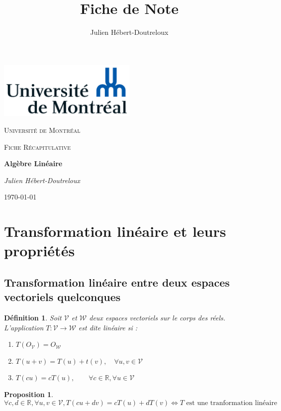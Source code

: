 \documentclass{article}[french, babel]
\author{Julien Hébert-Doutreloux}
\title{Fiche de Note}
\newtheorem{mydef}{Définition}
\newtheorem{myprop}{Proposition}
\let\stdsection\section
\renewcommand\section{\newpage\stdsection}
\begin{document}
		\begin{titlepage}
		\centering
		\includegraphics[width=0.5\textwidth]{Universite_de_Montreal_logo}\par\vspace{1cm}
		{\scshape\LARGE Université de Montréal\par}
		\vspace{1cm}
		{\scshape\Large Fiche Récapitulative\par}
		\vspace{1.5cm}
		{\huge\bfseries Algèbre Linéaire\par}
		\vspace{2cm}
		{\Large\itshape Julien Hébert-Doutreloux\par}
		\vfill
		\vfill
		{\large \today\par}
	\end{titlepage}
\setcounter{page}{2}
	\tableofcontents
	\newpage
\section{Transformation linéaire et leurs propriétés}
	\subsection{Transformation linéaire entre deux espaces vectoriels quelconques}
		\begin{mydef}
				Soit $\mathcal{V}$ et $\mathcal{W}$ deux espaces vectoriels sur le corps des réels. L'application $T:\mathcal{V}\longrightarrow\mathcal{W}$ est dite linéaire si :
				\begin{enumerate}
					\item $T(O_{\mathcal{V}})=O_{\mathcal{W}}$
					\item $T(u+v)=T(u)+t(v),\quad\forall u,v\in\mathcal{V}$
					\item $T(cu)=cT(u),\quad\quad\forall c\in\mathbb{R}, \forall u\in\mathcal{V}$
				\end{enumerate}
			\end{mydef}
		\begin{myprop}
				\[\forall c,d\in\mathbb{R},\forall u,v\in\mathcal{V},T(cu+dv)=cT(u)+dT(v) \Longleftrightarrow T \text{ est une tranformation linéaire} \]
		\end{myprop}
\end{document}

